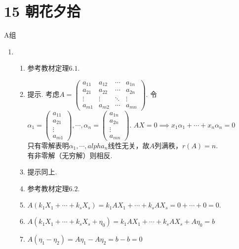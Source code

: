 \section*{15 朝花夕拾}

\vspace{2ex}

\centerline{\heiti A组}
\begin{enumerate}
    \item
        \begin{enumerate}
            \item 参考教材定理$6.1$.
            \item 提示. 考虑$A=\begin{pmatrix}
                a_{11} & a_{12} & \cdots & a_{1n} \\
                a_{21} & a_{22} & \cdots & a_{2n} \\
                \vdots & \vdots & \ddots & \vdots \\
                a_{m1} & a_{m2} & \cdots & a_{mn}
            \end{pmatrix}.$
            令$\alpha_1=\begin{pmatrix}
                a_{11} \\
                a_{21} \\
                \vdots \\
                a_{m1}
            \end{pmatrix},\cdots,\alpha_n=\begin{pmatrix}
                a_{1n} \\
                a_{2n} \\
                \vdots \\
                a_{mn}
            \end{pmatrix}.$
            $AX=0\implies x_1\alpha_1+\cdots+x_n\alpha_n=0$\\
            只有零解表明$\alpha_1,\cdots,alpha_n$线性无关，故$A$列满秩，$r(A)=n$.\\
            有非零解（无穷解）则相反.
            \item 提示同上.
            \item 参考教材定理$6.2$.
            \item $A(k_1X_1+\cdots+k_sX_s)=k_1AX_1+\cdots+k_sAX_s=0+\cdots+0=0.$
            \item $A(k_1X_1+\cdots+k_sX_s+\eta_0)=k_1AX_1+\cdots+k_sAX_s+A\eta_0=b$
            \item $A(\eta_1-\eta_2)=A\eta_1-A\eta_2=b-b=0$

\end{enumerate}
\end{enumerate}
